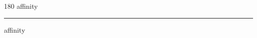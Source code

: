 
\begin{frame}
\begin{center}
\begin{turn}{180}
{\fontsize{2.5cm}{1em}\selectfont affinity}
\end{turn}
\vspace{1em}\par  
\hrule
\vspace{1em}\par  
{\fontsize{2.5cm}{1em}\selectfont affinity}
\end{center}
\end{frame}

